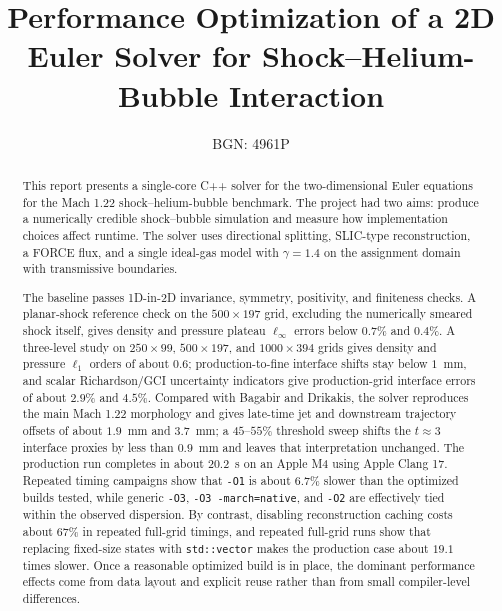 \documentclass[final,3p,times,twocolumn]{elsarticle}
\begin{document}
\begin{frontmatter}

\title{Performance Optimization of a 2D Euler Solver for Shock--Helium-Bubble Interaction}

\author{BGN: 4961P}

\begin{abstract}
This report presents a single-core C++ solver for the two-dimensional Euler equations for the Mach 1.22 shock--helium-bubble benchmark. The project had two aims: produce a numerically credible shock--bubble simulation and measure how implementation choices affect runtime. The solver uses directional splitting, SLIC-type reconstruction, a FORCE flux, and a single ideal-gas model with $\gamma = 1.4$ on the assignment domain with transmissive boundaries.

The baseline passes 1D-in-2D invariance, symmetry, positivity, and finiteness checks. A planar-shock reference check on the $500 \times 197$ grid, excluding the numerically smeared shock itself, gives density and pressure plateau $\ell_\infty$ errors below $0.7\%$ and $0.4\%$. A three-level study on $250 \times 99$, $500 \times 197$, and $1000 \times 394$ grids gives density and pressure $\ell_1$ orders of about $0.6$; production-to-fine interface shifts stay below $1$~mm, and scalar Richardson/GCI uncertainty indicators give production-grid interface errors of about $2.9\%$ and $4.5\%$. Compared with Bagabir and Drikakis, the solver reproduces the main Mach 1.22 morphology and gives late-time jet and downstream trajectory offsets of about $1.9$~mm and $3.7$~mm; a $45$--$55\%$ threshold sweep shifts the $t \approx 3$ interface proxies by less than $0.9$~mm and leaves that interpretation unchanged. The production run completes in about $20.2$~s on an Apple M4 using Apple Clang 17. Repeated timing campaigns show that \texttt{-O1} is about $6.7\%$ slower than the optimized builds tested, while generic \texttt{-O3}, \texttt{-O3 -march=native}, and \texttt{-O2} are effectively tied within the observed dispersion. By contrast, disabling reconstruction caching costs about $67\%$ in repeated full-grid timings, and repeated full-grid runs show that replacing fixed-size states with \texttt{std::vector} makes the production case about $19.1$ times slower. Once a reasonable optimized build is in place, the dominant performance effects come from data layout and explicit reuse rather than from small compiler-level differences.
\end{abstract}

\end{frontmatter}
\end{document}
